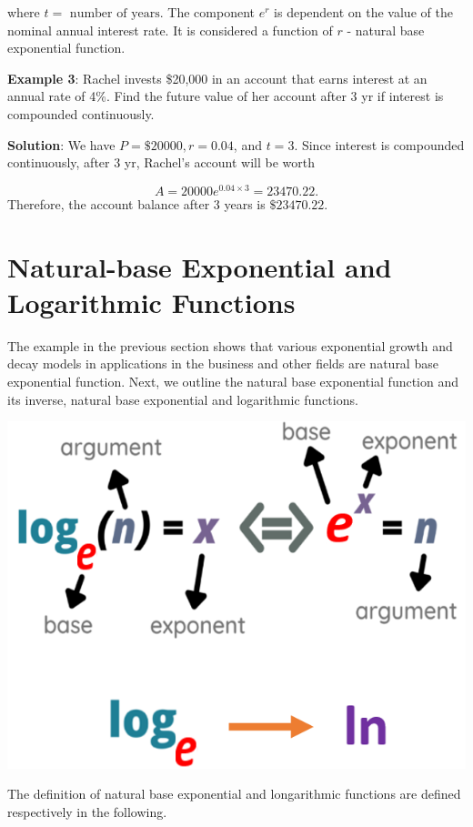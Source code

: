 \documentclass[
]{book}
\begin{document}
where \(t = \text{ number of years}\). The component \(e^r\) is dependent on the value of the nominal annual interest rate. It is considered a function of \(r\) - natural base exponential function.

\hfill\break

\textbf{Example 3}: Rachel invests \$20,000 in an account that earns interest at an annual rate of 4\%. Find the future value of her account after 3 yr if interest is compounded continuously.

\textbf{Solution}: We have \(P =\$20000, r = 0.04\), and \(t = 3\). Since interest is compounded continuously, after 3 yr, Rachel's account will be worth

\[
A = 20000e^{0.04\times 3} = 23470.22.
\]
Therefore, the account balance after 3 years is \(\$23470.22\).

\hfill\break

\hypertarget{natural-base-exponential-and-logarithmic-functions}{%
\section{Natural-base Exponential and Logarithmic Functions}\label{natural-base-exponential-and-logarithmic-functions}}

The example in the previous section shows that various exponential growth and decay models in applications in the business and other fields are natural base exponential function. Next, we outline the natural base exponential function and its inverse, natural base exponential and logarithmic functions.

\begin{center}\includegraphics[width=0.6\linewidth]{img04/w04-NaturalExpLogDef} \end{center}

\hfill\break

The definition of natural base exponential and longarithmic functions are defined respectively in the following.
\end{document}
